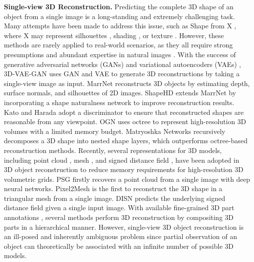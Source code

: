 \documentclass[twocolumn]{svjour3}
\begin{document}
\noindent \textbf{Single-view 3D Reconstruction.}
Predicting the complete 3D shape of an object from a single image is a long-standing and extremely challenging task.
Many attempts have been made to address this issue, such as Shape from X \citep{DBLP:journals/pami/BarronM15}, where X may represent silhouettes \citep{DBLP:conf/cvpr/DibraJOZG17}, shading \citep{DBLP:conf/cvpr/RichterR15}, or texture \citep{DBLP:journals/ai/Witkin81}.
However, these methods are rarely applied to real-world scenarios, as they all require strong presumptions and abundant expertise in natural images \citep{DBLP:journals/access/ZhangLLPL19}.
With the success of generative adversarial networks (GANs) \citep{DBLP:conf/nips/GoodfellowPMXWOCB14} and variational autoencoders (VAEs) \citep{DBLP:conf/iclr/KingmaW14}, 3D-VAE-GAN \citep{DBLP:conf/nips/0001ZXFT16} uses GAN and VAE to generate 3D reconstructions by taking a single-view image as input.
MarrNet \citep{DBLP:conf/nips/0001WXSFT17} reconstructs 3D objects by estimating depth, surface normals, and silhouettes of 2D images.
ShapeHD \citep{DBLP:conf/eccv/WuZZZFT18} extends MarrNet by incorporating a shape naturalness network to improve reconstruction results.
Kato and Harada \citep{DBLP:conf/cvpr/KatoH19} adopt a discriminator to ensure that reconstructed shapes are reasonable from any viewpoint.
OGN \citep{DBLP:conf/iccv/TatarchenkoDB17} uses octree to represent high-resolution 3D volumes with a limited memory budget.
Matryoshka Networks \citep{DBLP:conf/cvpr/Richter018} recursively decomposes a 3D shape into nested shape layers, which outperforms octree-based reconstruction methods.
Recently, several representations for 3D models, including point cloud \citep{DBLP:conf/cvpr/FanSG17}, mesh \citep{DBLP:conf/eccv/WangZLFLJ18}, and signed distance field \citep{DBLP:conf/nips/XuWDRU19}, have been adopted in 3D object reconstruction to reduce memory requirements for high-resolution 3D volumetric grids.
PSG \citep{DBLP:conf/cvpr/FanSG17} firstly recovers a point cloud from a single image with deep neural networks.
Pixel2Mesh \citep{DBLP:conf/eccv/WangZLFLJ18} is the first to reconstruct the 3D shape in a triangular mesh from a single image.
DISN \citep{DBLP:conf/nips/XuWDRU19} predicts the underlying signed distance field given a single input image.
With available fine-grained 3D part annotations \citep{DBLP:conf/cvpr/MoZCYTGS19}, several methods \citep{DBLP:conf/cvpr/PaschalidouGG20,DBLP:journals/tog/MoGYSWMG19,DBLP:journals/tog/ZhuXCYZ18} perform 3D reconstruction by compositing 3D parts in a hierarchical manner.
However, single-view 3D object reconstruction is an ill-posed and inherently ambiguous problem since partial observation of an object can theoretically be associated with an infinite number of possible 3D models.
\end{document}
